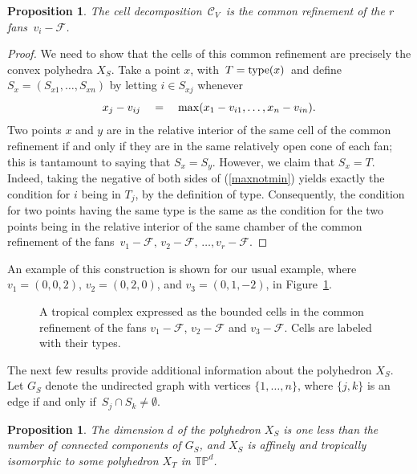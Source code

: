 \documentclass[11pt]{amsart}
\newtheorem{prop}[thm]{Proposition}
\newcommand{\TP}{\mathbb{TP}}
\begin{document}
\begin{prop}\label{fans}
The cell decomposition $\, {\mathcal C}_V\,$ is the common refinement of
the $r$ fans $\, v_i - {\mathcal F}$.
\end{prop}

\begin{proof}
We need to show that the cells of this common refinement are 
precisely the convex polyhedra $X_S$. Take 
a point $x$, with $\, T = {\rm type}(x)\,$
and define $S_x=(S_{x1},\ldots,S_{xn})$ by letting $i\in S_{xj}$ whenever
\begin{equation}
\label{maxnotmin}
x_j -v_{ij}\quad = \quad {\rm max}(x_1-v_{i1},\ldots,x_n-v_{in}).
\end{equation}
Two points $x$ and $y$ are in the relative interior of the same 
cell of the common refinement if 
and only if they are in 
the same relatively open cone of each fan; this is tantamount to saying that $S_x=S_y$. However, 
we claim that 
$S_x = T$. Indeed, taking the negative of 
both sides of (\ref{maxnotmin})
yields exactly the condition for $i$ being in $T_j$,
 by the definition of type. 
Consequently, the condition for two points having the same type is the same as the condition for 
the two points being in the relative interior of the same 
chamber of the common refinement of the fans
$\,  v_1 - {\mathcal F},\,
v_2 - {\mathcal F},\,\ldots,v_r - {\mathcal F}$.
\end{proof}

An example of this construction is shown for our usual example, where $v_1=(0,0,2)$, $v_2=(0,2,0)$, and 
$v_3=(0,1,-2)$, in Figure~\ref{tropfans}.

\begin{figure}

\caption{\label{tropfans}
A tropical complex 
expressed as the bounded cells in the common refinement
of the fans  
$ v_1 - {\mathcal F}$,
$ v_2 - {\mathcal F}$ and
$ v_3 - {\mathcal F}$.
Cells are labeled with their types.}
\end{figure}

The next few results provide additional information
about the polyhedron $X_S$. 
Let $G_S$ denote the  undirected  
graph with vertices $\{1,\ldots,n\}$, 
where  $\{j,k\}$ is an edge
if and only if $\,S_j \cap S_k\neq \emptyset$.

\begin{prop}\label{dimension}
The dimension $d$ of the polyhedron $X_S$ is one less than the number of 
connected components of $G_S$, and $X_S$ 
is affinely and tropically isomorphic to some polyhedron
$X_T$ in $\TP^{d}$.
\end{prop} 
\end{document}
